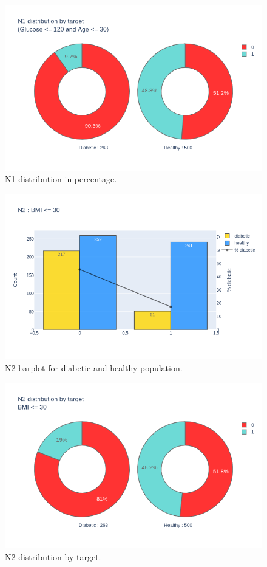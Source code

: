\documentclass[12pt]{article}
\begin{document}
\begin{figure}[ht]
\centering
\includegraphics[width=1\textwidth]{newplot(14).png}
\caption{\label{fig:24} N1 distribution in percentage.}
\end{figure}

\begin{figure}[ht]
\centering
\includegraphics[width=1\textwidth]{newplot(15).png}
\caption{\label{fig:25} N2 barplot for diabetic and healthy population.}
\end{figure}

\begin{figure}[ht]
\centering
\includegraphics[width=1\textwidth]{newplot(16).png}
\caption{\label{fig:26} N2 distribution by target.}
\end{figure}
\end{document}
